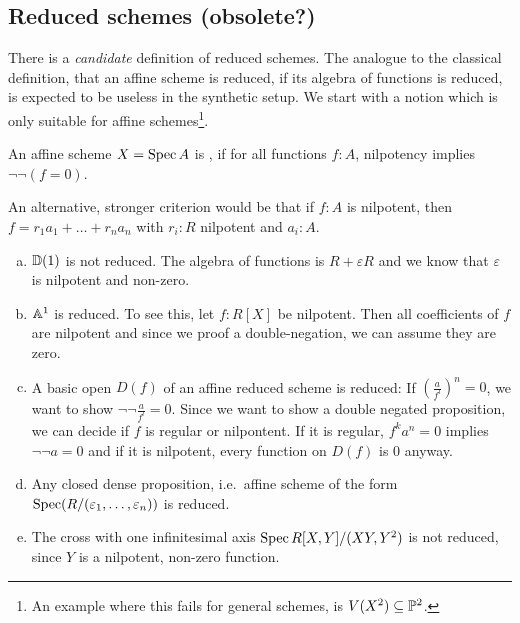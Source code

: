 
\subsection{Reduced schemes (obsolete?)}


There is a \emph{candidate} definition of reduced schemes.
The analogue to the classical definition, that an affine scheme is reduced,
if its algebra of functions is reduced, is expected to be useless in the synthetic setup.
We start with a notion which is only suitable for affine schemes\footnote{An example where this fails for general schemes, is $V(X^2)\subseteq\mathbb{P}^2$.}.

\begin{definition}\label{candidate-reduced}
  An affine scheme $X=\operatorname{Spec} A$ is ,
  if for all functions $f:A$, nilpotency implies $\neg\neg (f=0)$.
\end{definition}

An alternative, stronger criterion would be that if $f : A$ is nilpotent, then
$f = r_1 a_1 + \ldots + r_n a_n$ with $r_i : R$ nilpotent and $a_i : A$.

\begin{example}
  \begin{enumerate}[(a)]
  \item $\mathbb{D}(1)$ is not reduced.
    The algebra of functions is $R+\varepsilon R$ and we know that $\varepsilon$ is nilpotent and non-zero.
  \item $\mathbb{A}^1$ is reduced. To see this, let $f:R[X]$ be nilpotent.
    Then all coefficients of $f$ are nilpotent and since we proof a double-negation,
    we can assume they are zero.
  \item A basic open $D(f)$ of an affine reduced scheme is reduced:
    If $\left(\frac{a}{f^l}\right)^n=0$, we want to show $\neg\neg \frac{a}{f^l} = 0$.
    Since we want to show a double negated proposition, we can decide if $f$ is regular or nilpontent.
    If it is regular, $f^ka^n=0$ implies $\neg\neg a = 0$ and if it is nilpotent, every function on $D(f)$ is $0$ anyway.
  \item Any closed dense proposition, i.e.\ affine scheme of the form $\operatorname{Spec} (R/(\varepsilon_1,\dots,\varepsilon_n))$ is reduced.
  \item The cross with one infinitesimal axis $\operatorname{Spec} R[X,Y]/(XY,Y^2)$ is not reduced, since $Y$ is a nilpotent, non-zero function.
  \end{enumerate}
\end{example}

